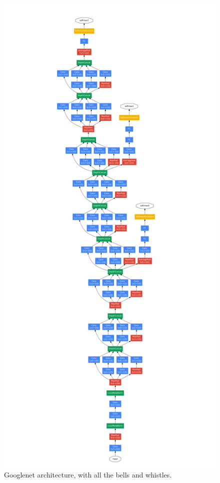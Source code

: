 \documentclass[10pt,journal,compsoc]{IEEEtran}
\begin{document}
		
		\clearpage
		\begin{figure}[h]
			\centering
			\includegraphics[scale=1]{googlenet_arch}
			\caption{Googlenet architecture, with all the bells and whistles.}
		\end{figure}
		\clearpage
		
\end{document}
